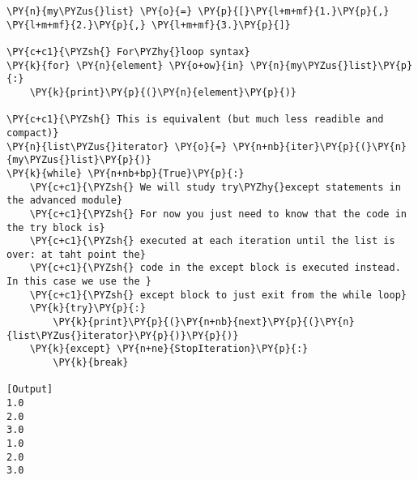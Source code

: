 \begin{Verbatim}[label=\makebox{\url{https://github.com/lucabaldini/cmepda/tree/master/slides/latex/snippets/show\_iterator.py}},commandchars=\\\{\}]
\PY{n}{my\PYZus{}list} \PY{o}{=} \PY{p}{[}\PY{l+m+mf}{1.}\PY{p}{,} \PY{l+m+mf}{2.}\PY{p}{,} \PY{l+m+mf}{3.}\PY{p}{]}

\PY{c+c1}{\PYZsh{} For\PYZhy{}loop syntax}
\PY{k}{for} \PY{n}{element} \PY{o+ow}{in} \PY{n}{my\PYZus{}list}\PY{p}{:}
    \PY{k}{print}\PY{p}{(}\PY{n}{element}\PY{p}{)}

\PY{c+c1}{\PYZsh{} This is equivalent (but much less readible and compact)}
\PY{n}{list\PYZus{}iterator} \PY{o}{=} \PY{n+nb}{iter}\PY{p}{(}\PY{n}{my\PYZus{}list}\PY{p}{)}
\PY{k}{while} \PY{n+nb+bp}{True}\PY{p}{:}
    \PY{c+c1}{\PYZsh{} We will study try\PYZhy{}except statements in the advanced module}
    \PY{c+c1}{\PYZsh{} For now you just need to know that the code in the try block is}
    \PY{c+c1}{\PYZsh{} executed at each iteration until the list is over: at taht point the}
    \PY{c+c1}{\PYZsh{} code in the except block is executed instead. In this case we use the }
    \PY{c+c1}{\PYZsh{} except block to just exit from the while loop}
    \PY{k}{try}\PY{p}{:}
        \PY{k}{print}\PY{p}{(}\PY{n+nb}{next}\PY{p}{(}\PY{n}{list\PYZus{}iterator}\PY{p}{)}\PY{p}{)}
    \PY{k}{except} \PY{n+ne}{StopIteration}\PY{p}{:}
        \PY{k}{break}

[Output]
1.0
2.0
3.0
1.0
2.0
3.0
\end{Verbatim}